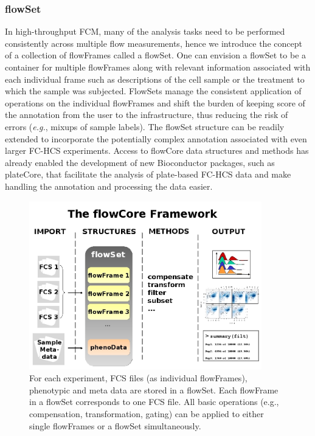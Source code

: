 \documentclass[12pt]{article}
\begin{document}
\subsubsection*{flowSet}
In high-throughput FCM, many of the analysis tasks need to be
performed consistently across multiple flow measurements, hence we
introduce the concept of a collection of flowFrames called a
flowSet. One can envision a flowSet to be a container for multiple
flowFrames along with relevant information associated with each
individual frame such as descriptions of the cell sample or the
treatment to which the sample was subjected. FlowSets manage the
consistent application of operations on the individual flowFrames and
shift the burden of keeping score of the annotation from the user to
the infrastructure, thus reducing the risk of errors (\textit{e.g.},
mixups of sample labels). The flowSet structure can be readily
extended to incorporate the potentially complex annotation associated
with even larger FC-HCS experiments. Access to flowCore data
structures and methods has already enabled the development of new
Bioconductor packages, such as plateCore, that facilitate the analysis
of plate-based FC-HCS data and make handling the annotation and
processing the data easier.


\begin{figure}
\centering
\includegraphics[width=0.9\textwidth]{Figure1-flowCoreFrameWork.jpg}
\caption{\label{fig1:FrameWork}{For each experiment, FCS files (as
    individual flowFrames), phenotypic and meta data are stored in a
    flowSet. Each flowFrame in a flowSet corresponds to one FCS
    file. All basic operations (e.g., compensation, transformation,
    gating) can be applied to either single flowFrames or a flowSet
    simultaneously.}}
\end{figure}
\end{document}
